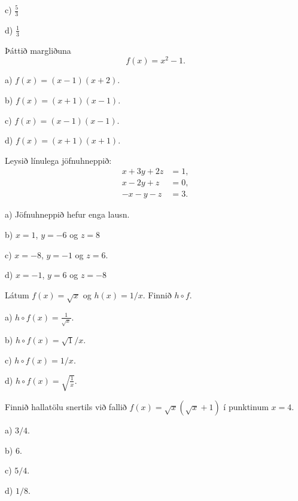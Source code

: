 c) \hspace{2mm} $\displaystyle\frac{5}{3}$

d) \hspace{2mm} $\displaystyle\frac{1}{3}$


\item Þáttið margliðuna $$f(x) = x^2 -1.$$

a) $f(x) = (x-1)(x+2)$.

b) $f(x) = (x+1)(x-1)$. %

c) $f(x) = (x-1)(x-1)$.

d) $f(x) = (x+1)(x+1)$.


\item Leysið línulega jöfnuhneppið:
\begin{align*}
x + 3y + 2z &= 1, \\
x - 2y + z &= 0, \\
-x - y - z &= 3.
\end{align*}

a) Jöfnuhneppið hefur enga lausn.

b) $x = 1$, $y = -6$ og $z = 8$

c) $x = -8$, $y = -1$ og $z = 6$. %

d) $x = -1$, $y = 6$ og $z = -8$


\item Látum $f(x)=\sqrt x$ og $h(x)=1/x$. Finnið $h\circ f$.

a) $h\circ f(x) = \frac{1}{\sqrt x}$. %

b) $h \circ f(x) = \sqrt{1}/x$.

c) $h \circ f(x) = 1/x$.

d) $h \circ f(x) = \sqrt{\frac 1x}$.


\item Finnið hallatölu snertils við fallið $f(x) = \sqrt x
\left( \sqrt{x} + 1\right)$ í punktinum $x=4$.

a) $3/4$.

b) $6$.

c) $5/4$. %

d) $1/8$.


